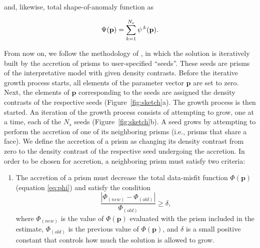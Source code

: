 \documentclass[twocolumn,final]{svjour3}
\newcommand{\vect}[1]{\mathbf{#1}}
\begin{document}
\begin{sloppypar}
and, likewise, total shape-of-anomaly function as

\begin{equation}
    \Psi(\vect{p}) = \sum\limits_{k=1}^{N_{c}} \psi^{\thinspace k}(\vect{p}).
    \label{eq:shape}
\end{equation}

From now on, we follow the methodology of \citet{uieda_planting}, in which the
solution is iteratively built by the accretion of prisms to user-specified
``seeds''.
These seeds are prisms of the interpretative model with given density contrasts.
Before the iterative growth process starts, all elements of the parameter vector
$\vect{p}$ are set to zero.
Next, the elements of $\vect{p}$ corresponding to the seeds are assigned the
density contrasts of the respective seeds (Figure~\ref{fig:sketch}a).
The growth process is then started.
An iteration of the growth process consists of attempting to grow, one at a
time, each of the $N_{s}$ seeds (Figure~\ref{fig:sketch}b).
A seed grows by attempting to perform the accretion of one of its neighboring
prisms (i.e., prisms that share a face).
We define the accretion of a prism as changing its density contrast from zero to
the density contrast of the respective seed undergoing the accretion.
In order to be chosen for accretion, a neighboring prism must satisfy two
criteria:

\begin{enumerate}
    \item The accretion of a prism must decrease the total data-misfit
    function $\Phi(\vect{p})$ (equation \ref{eq:phi}) and satisfy the condition
    \begin{equation}
        \dfrac{|\Phi_{(new)} - \Phi_{(old)}|}{\Phi_{(old)}} \ge \delta ,
        \label{eq:delta}
    \end{equation}
    where $\Phi_{(new)}$ is the value of $\Phi(\vect{p})$ evaluated with the
    prism included in the estimate, $\Phi_{(old)}$ is the previous value of
    $\Phi(\vect{p})$, and $\delta$ is a small positive constant that controls
    how much the solution is allowed to grow.


\end{enumerate}
\end{sloppypar}
\end{document}
